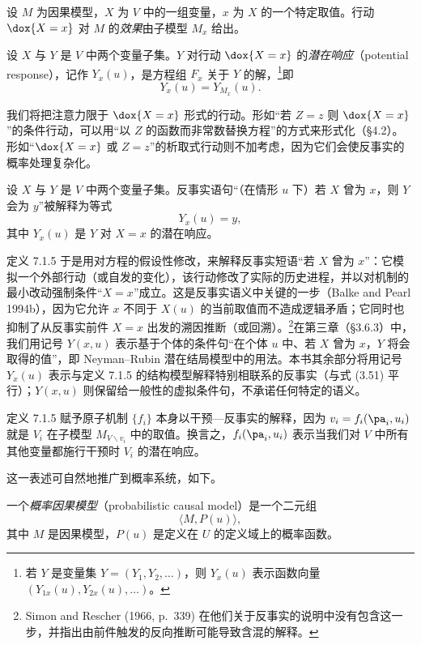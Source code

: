 \begin{definition}[行动的效果]
设 $M$ 为因果模型，$X$ 为 $V$ 中的一组变量，$x$ 为 $X$ 的一个特定取值。行动 $\dox{X=x}$ 对 $M$ 的\emph{效果}由子模型 $M_x$ 给出。
\end{definition}

\begin{definition}[潜在响应]
设 $X$ 与 $Y$ 是 $V$ 中两个变量子集。$Y$ 对行动 $\dox{X=x}$ 的\emph{潜在响应}（potential response），记作 $Y_x(u)$，是方程组 $F_x$ 关于 $Y$ 的解，\footnote{若 $Y$ 是变量集 $Y=(Y_1,Y_2,\dots)$，则 $Y_x(u)$ 表示函数向量 $(Y_{1x}(u),Y_{2x}(u),\dots)$。}即
\[
Y_x(u)=Y_{M_x}(u).
\]
\end{definition}

我们将把注意力限于 $\dox{X=x}$ 形式的行动。形如“若 $Z=z$ 则 $\dox{X=x}$”的条件行动，可以用“以 $Z$ 的函数而非常数替换方程”的方式来形式化（\S 4.2）。形如“$\dox{X=x}$ 或 $Z=z$”的析取式行动则不加考虑，因为它们会使反事实的概率处理复杂化。

\begin{definition}[反事实]
设 $X$ 与 $Y$ 是 $V$ 中两个变量子集。反事实语句“（在情形 $u$ 下）若 $X$ 曾为 $x$，则 $Y$ 会为 $y$”被解释为等式
\[
Y_x(u)=y,
\]
其中 $Y_x(u)$ 是 $Y$ 对 $X=x$ 的潜在响应。
\end{definition}

定义 7.1.5 于是用对方程的假设性修改，来解释反事实短语“若 $X$ 曾为 $x$”：它模拟一个外部行动（或自发的变化），该行动修改了实际的历史进程，并以对机制的最小改动强制条件“$X=x$”成立。这是反事实语义中关键的一步（Balke and Pearl 1994b），因为它允许 $x$ 不同于 $X(u)$ 的当前取值而不造成逻辑矛盾；它同时也抑制了从反事实前件 $X=x$ 出发的溯因推断（或回溯）。\footnote{Simon and Rescher (1966, p.~339) 在他们关于反事实的说明中没有包含这一步，并指出由前件触发的反向推断可能导致含混的解释。}在第三章（\S 3.6.3）中，我们用记号 $Y(x,u)$ 表示基于个体的条件句“在个体 $u$ 中、若 $X$ 曾为 $x$，$Y$ 将会取得的值”，即 Neyman–Rubin 潜在结局模型中的用法。本书其余部分将用记号 $Y_x(u)$ 表示与定义 7.1.5 的结构模型解释特别相联系的反事实（与式 \textup{(3.51)} 平行）；$Y(x,u)$ 则保留给一般性的虚拟条件句，不承诺任何特定的语义。

定义 7.1.5 赋予原子机制 $\{f_i\}$ 本身以干预—反事实的解释，因为 $v_i=f_i(\pa_i,u_i)$ 就是 $V_i$ 在子模型 $M_{V\backslash v_i}$ 中的取值。换言之，$f_i(\pa_i,u_i)$ 表示当我们对 $V$ 中所有其他变量都施行干预时 $V_i$ 的潜在响应。

这一表述可自然地推广到概率系统，如下。

\begin{definition}[概率因果模型]
一个\emph{概率因果模型}（probabilistic causal model）是一个二元组
\[
\langle M,P(u)\rangle,
\]
其中 $M$ 是因果模型，$P(u)$ 是定义在 $U$ 的定义域上的概率函数。
\end{definition}

